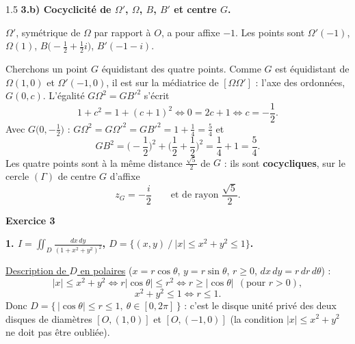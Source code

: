 \documentclass[12pt]{article}
\begin{document}
\begin{spacing}{1.5}
\textbf{3.b) Cocyclicité de $\Omega'$, $\Omega$, $B$, $B'$ et centre $G$.}

$\Omega'$, symétrique de $\Omega$ par rapport à $O$, a pour affixe $-1$. Les points sont $\Omega'(-1)$, $\Omega(1)$, $B\big(-\frac12+\frac12i\big)$, $B'(-1-i)$.

Cherchons un point $G$ équidistant des quatre points. Comme $G$ est équidistant de $\Omega(1,0)$ et $\Omega'(-1,0)$, il est sur la médiatrice de $[\Omega\Omega']$ : l'axe des ordonnées, $G(0,c)$. L'égalité $G\Omega^2=GB'^2$ s'écrit
\[
1+c^2=1+(c+1)^2\iff 0=2c+1\iff c=-\frac12 .
\]
Avec $G\big(0,-\frac12\big)$ : $G\Omega^2=G\Omega'^2=GB'^2=1+\frac14=\frac54$ et
\[
GB^2=\Big(-\frac12\Big)^2+\Big(\frac12+\frac12\Big)^2=\frac14+1=\frac54 .
\]
Les quatre points sont à la même distance $\frac{\sqrt5}{2}$ de $G$ : ils sont \textbf{cocycliques}, sur le cercle $(\Gamma)$ de centre $G$ d'affixe
\[
\boxed{z_G=-\frac i2}\qquad\text{et de rayon }\frac{\sqrt5}{2}.
\]

\begin{center}
\end{center}

\medskip\textbf{Exercice 3}

\textbf{1. $I=\displaystyle\iint_D\frac{dx\,dy}{(1+x^2+y^2)^2}$, \quad $D=\{(x,y)\ /\ |x|\le x^2+y^2\le1\}$.}

\underline{Description de $D$ en polaires} ($x=r\cos\theta$, $y=r\sin\theta$, $r\ge0$, $dx\,dy=r\,dr\,d\theta$) :
\[
|x|\le x^2+y^2\iff r|\cos\theta|\le r^2\iff r\ge|\cos\theta|\ \ (\text{pour } r>0),
\]
\[
x^2+y^2\le1\iff r\le1 .
\]
Donc $D=\{\,|\cos\theta|\le r\le1,\ \theta\in[0,2\pi]\,\}$ : c'est le disque unité privé des deux disques de diamètres $[O,(1,0)]$ et $[O,(-1,0)]$ (la condition $|x|\le x^2+y^2$ ne doit pas être oubliée).


\end{spacing}
\end{document}
